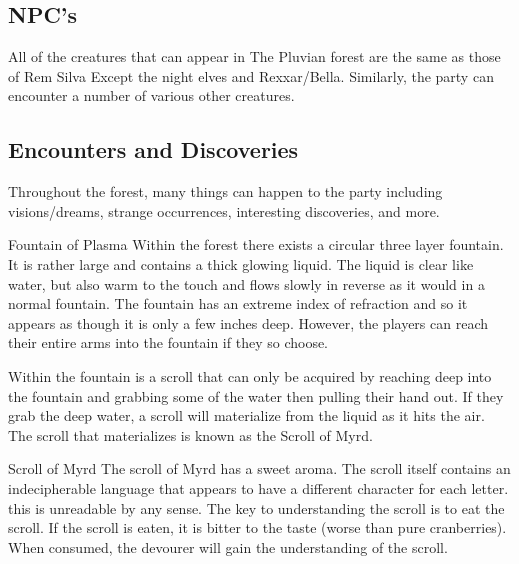 \subsection{NPC's}

All of the creatures that can appear in The Pluvian forest are the same as those of Rem Silva Except the night elves and Rexxar/Bella. Similarly, the party can encounter a number of various other creatures.

\subsection{Encounters and Discoveries}

Throughout the forest, many things can happen to the party including visions/dreams, strange occurrences, interesting discoveries, and more.

\begin{commentbox}{Fountain of Plasma}
	Within the forest there exists a circular three layer fountain. It is rather large and contains a thick glowing liquid. The liquid is clear like water, but also warm to the touch and flows slowly in reverse as it would in a normal fountain. The fountain has an extreme index of refraction and so it appears as though it is only a few inches deep. However, the players can reach their entire arms into the fountain if they so choose.
	
	Within the fountain is a scroll that can only be acquired by reaching deep into the fountain and grabbing some of the water then pulling their hand out. If they grab the deep water, a scroll will materialize from the liquid as it hits the air. The scroll that materializes is known as the Scroll of Myrd.
\end{commentbox}


\begin{commentbox}{Scroll of Myrd}
	The scroll of Myrd has a sweet aroma. The scroll itself contains an indecipherable language that appears to have a different character for each letter. this is unreadable by any sense. The key to understanding the scroll is to eat the scroll. If the scroll is eaten, it is bitter to the taste (worse than pure cranberries). When consumed, the devourer will gain the understanding of the scroll.	
\end{commentbox}


